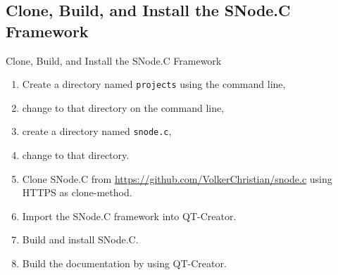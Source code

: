 \subsection{Clone, Build, and Install the SNode.C Framework}

\begin{frame}{Clone, Build, and Install the SNode.C Framework}
  \begin{enumerate}
    \item Create a directory named \lstinline|projects| using the command line,
    \item change to that directory on the command line,
    \item create a directory named \lstinline|snode.c|,
    \item change to that directory.
    \item Clone SNode.C from \textcolor{fh-ooe-red}{\href{https://github.com/VolkerChristian/snode.c}{https://github.com/VolkerChristian/snode.c}} using \textcolor{fh-ooe-red}{HTTPS} as clone-method.
    \item Import the SNode.C framework into QT-Creator.
    \item Build and install SNode.C.
    \item Build the documentation by using QT-Creator.
  \end{enumerate}
\end{frame}
